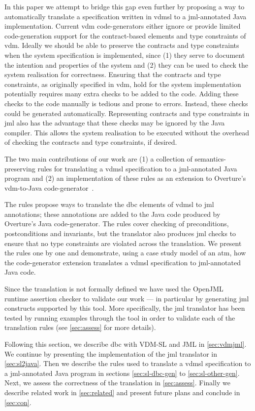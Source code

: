 In this paper we attempt to bridge this gap even further by proposing
a way to automatically translate a specification written in \ac{vdmsl}
to a \ac{jml}-annotated Java implementation. Current \ac{vdm}
code-generators either ignore or provide limited code-generation
support for the contract-based elements and type constraints of
\ac{vdm}. Ideally we should be able to preserve the contracts and type
constraints when the system specification is implemented, since (1)
they serve to document the intention and properties of the system and
(2) they can be used to check the system realisation for
correctness. Ensuring that the contracts and type constraints, as
originally specified in \ac{vdm}, hold for the system implementation
potentially requires many extra checks to be added to the code. Adding
these checks to the code manually is tedious and prone to
errors. Instead, these checks could be generated
automatically. Representing contracts and type constraints in \ac{jml}
also has the advantage that these checks may be ignored by the Java
compiler. This allows the system realisation to be executed without
the overhead of checking the contracts and type constraints, if
desired.

The two main contributions of our work are (1) a collection of
semantics-preserving rules for translating a \ac{vdmsl} specification
to a \ac{jml}-annotated Java program and (2) an implementation of
these rules as an extension to Overture's \cite{Larsen&10a,Overture}
\ac{vdm}-to-Java code-generator~\cite{Jorgensen&14a}.

The rules propose ways to translate the \ac{dbc} elements of
\ac{vdmsl} to \ac{jml} annotations; these annotations are added to the
Java code produced by Overture's Java code-generator. The rules cover
checking of preconditions, postconditions and invariants, but the
translator also produces \ac{jml} checks to ensure that no type
constraints are violated across the translation. We present the rules
one by one and demonstrate, using a case study model of an \ac{atm},
how the code-generator extension translates a \ac{vdmsl} specification
to \ac{jml}-annotated Java code.

Since the translation is not formally defined we have used the
OpenJML~\cite{Cok&11} runtime assertion checker to validate our work
--- in particular by generating \ac{jml} constructs supported by this
tool. More specifically, the \ac{jml} translator has been tested by
running examples through the tool in order to validate each of the
translation rules (see \autoref{sec:assess} for more details).

Following this section, we describe \ac{dbc} with VDM-SL and JML in
\autoref{sec:vdmjml}. We continue by presenting the implementation of
the \ac{jml} translator in \autoref{sec:sl2java}. Then we describe the
rules used to translate a \ac{vdmsl} specification to a
\ac{jml}-annotated Java program in sections \ref{sec:sl-dbc-gen} to
\ref{sec:sl-other-gen}. Next, we assess the correctness of the
translation in \autoref{sec:assess}. Finally we describe related work
in \autoref{sec:related} and present future plans and conclude in
\autoref{sec:con}.

